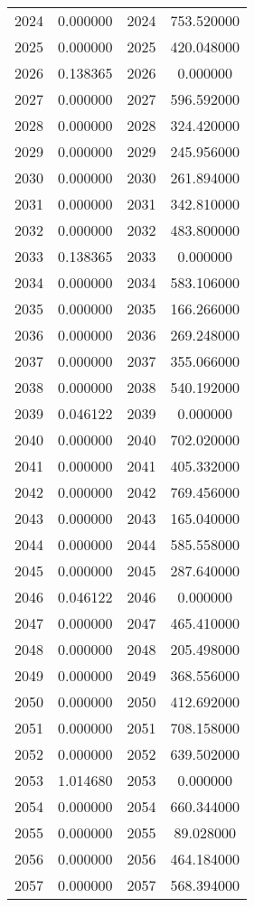\documentclass[12pt]{article}
\begin{document}
\begin{longtable}{@{}cccc@{}}
2024 & 0.000000 & 2024 & 753.520000 \\
2025 & 0.000000 & 2025 & 420.048000 \\
2026 & 0.138365 & 2026 & 0.000000 \\
2027 & 0.000000 & 2027 & 596.592000 \\
2028 & 0.000000 & 2028 & 324.420000 \\
2029 & 0.000000 & 2029 & 245.956000 \\
2030 & 0.000000 & 2030 & 261.894000 \\
2031 & 0.000000 & 2031 & 342.810000 \\
2032 & 0.000000 & 2032 & 483.800000 \\
2033 & 0.138365 & 2033 & 0.000000 \\
2034 & 0.000000 & 2034 & 583.106000 \\
2035 & 0.000000 & 2035 & 166.266000 \\
2036 & 0.000000 & 2036 & 269.248000 \\
2037 & 0.000000 & 2037 & 355.066000 \\
2038 & 0.000000 & 2038 & 540.192000 \\
2039 & 0.046122 & 2039 & 0.000000 \\
2040 & 0.000000 & 2040 & 702.020000 \\
2041 & 0.000000 & 2041 & 405.332000 \\
2042 & 0.000000 & 2042 & 769.456000 \\
2043 & 0.000000 & 2043 & 165.040000 \\
2044 & 0.000000 & 2044 & 585.558000 \\
2045 & 0.000000 & 2045 & 287.640000 \\
2046 & 0.046122 & 2046 & 0.000000 \\
2047 & 0.000000 & 2047 & 465.410000 \\
2048 & 0.000000 & 2048 & 205.498000 \\
2049 & 0.000000 & 2049 & 368.556000 \\
2050 & 0.000000 & 2050 & 412.692000 \\
2051 & 0.000000 & 2051 & 708.158000 \\
2052 & 0.000000 & 2052 & 639.502000 \\
2053 & 1.014680 & 2053 & 0.000000 \\
2054 & 0.000000 & 2054 & 660.344000 \\
2055 & 0.000000 & 2055 & 89.028000 \\
2056 & 0.000000 & 2056 & 464.184000 \\
2057 & 0.000000 & 2057 & 568.394000 \\

\end{longtable}
\end{document}
